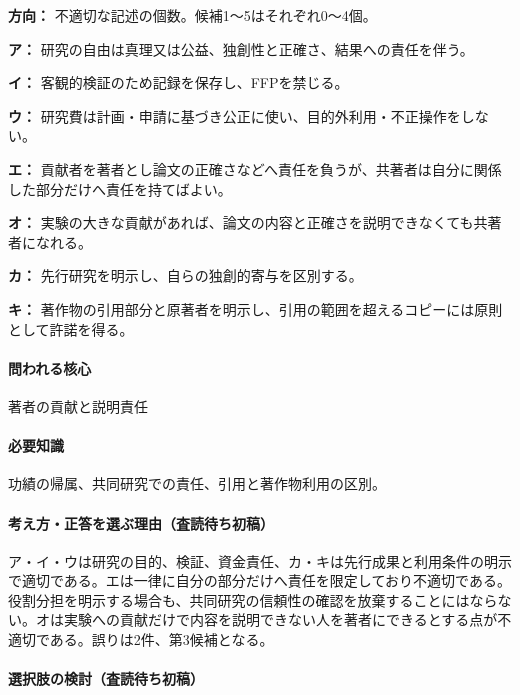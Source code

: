 \noindent\textbf{方向：} 不適切な記述の個数。候補1〜5はそれぞれ0〜4個。\par

\noindent\textbf{ア：} 研究の自由は真理又は公益、独創性と正確さ、結果への責任を伴う。\par

\noindent\textbf{イ：} 客観的検証のため記録を保存し、FFPを禁じる。\par

\noindent\textbf{ウ：} 研究費は計画・申請に基づき公正に使い、目的外利用・不正操作をしない。\par

\noindent\textbf{エ：} 貢献者を著者とし論文の正確さなどへ責任を負うが、共著者は自分に関係した部分だけへ責任を持てばよい。\par

\noindent\textbf{オ：} 実験の大きな貢献があれば、論文の内容と正確さを説明できなくても共著者になれる。\par

\noindent\textbf{カ：} 先行研究を明示し、自らの独創的寄与を区別する。\par

\noindent\textbf{キ：} 著作物の引用部分と原著者を明示し、引用の範囲を超えるコピーには原則として許諾を得る。\par

\paragraph{問われる核心} 著者の貢献と説明責任

\paragraph{必要知識} 功績の帰属、共同研究での責任、引用と著作物利用の区別。

\paragraph{考え方・正答を選ぶ理由（査読待ち初稿）} ア・イ・ウは研究の目的、検証、資金責任、カ・キは先行成果と利用条件の明示で適切である。エは一律に自分の部分だけへ責任を限定しており不適切である。役割分担を明示する場合も、共同研究の信頼性の確認を放棄することにはならない。オは実験への貢献だけで内容を説明できない人を著者にできるとする点が不適切である。誤りは2件、第3候補となる。

\paragraph{選択肢の検討（査読待ち初稿）}\mbox{}\par

